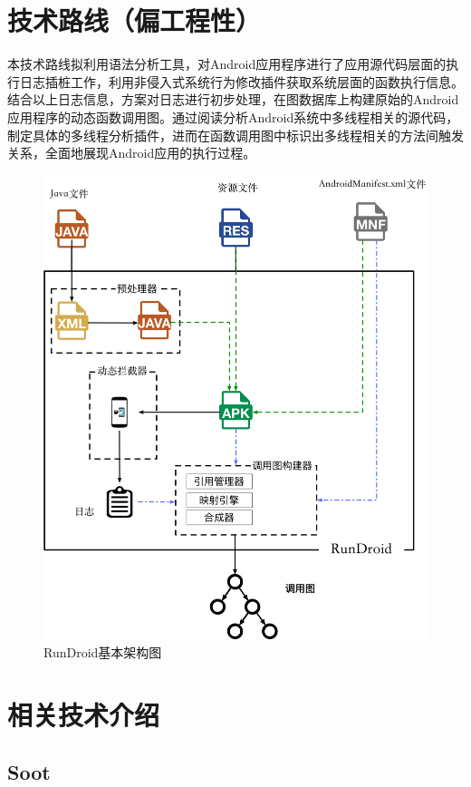 \section{技术路线（偏工程性）}
本技术路线拟利用语法分析工具，对Android应用程序进行了应用源代码层面的执行日志插桩工作，利用非侵入式系统行为修改插件获取系统层面的函数执行信息。结合以上日志信息，方案对日志进行初步处理，在图数据库上构建原始的Android应用程序的动态函数调用图。通过阅读分析Android系统中多线程相关的源代码，制定具体的多线程分析插件，进而在函数调用图中标识出多线程相关的方法间触发关系，全面地展现Android应用的执行过程。
 
 
\begin{figure}
\centering
\includegraphics[width=\textwidth]{./Figures/rundroid-overview.png}
\caption{ RunDroid基本架构图}
\label{fig:rundroid_overview}
\end{figure}


\section{相关技术介绍}

\subsection{Soot}

